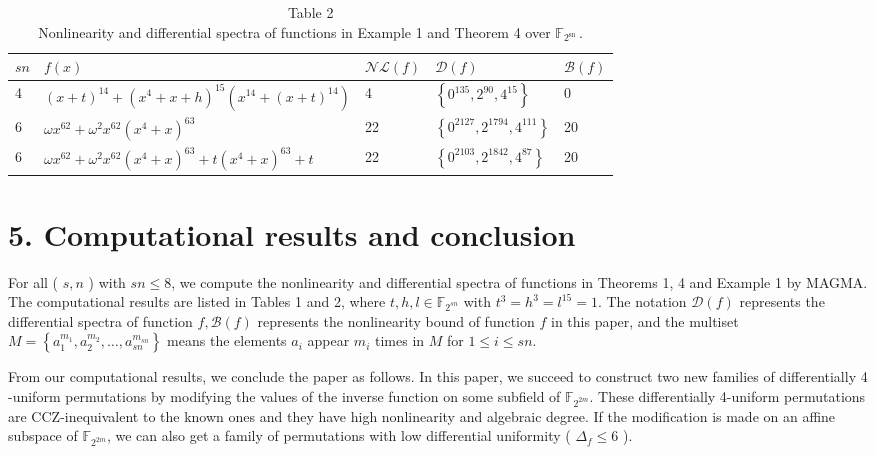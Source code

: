 \documentclass[10pt]{article}
\begin{document}
\begin{table}[h]
\begin{center}
\captionsetup{labelformat=empty}
\caption{Table 2\\
Nonlinearity and differential spectra of functions in Example 1 and Theorem 4 over $\mathbb{F}_{2^{\text {sn }}}$.}
\begin{tabular}{|l|l|l|l|l|}
\hline
$s n$ & $f(x)$ & $\mathcal{N} \mathcal{L}(f)$ & $\mathcal{D}(f)$ & $\mathcal{B}(f)$ \\
\hline
4 & $(x+t)^{14}+\left(x^{4}+x+h\right)^{15}\left(x^{14}+(x+t)^{14}\right)$ & 4 & $\left\{0^{135}, 2^{90}, 4^{15}\right\}$ & 0 \\
\hline
6 & $\omega x^{62}+\omega^{2} x^{62}\left(x^{4}+x\right)^{63}$ & 22 & $\left\{0^{2127}, 2^{1794}, 4^{111}\right\}$ & 20 \\
\hline
6 & $\omega x^{62}+\omega^{2} x^{62}\left(x^{4}+x\right)^{63}+t\left(x^{4}+x\right)^{63}+t$ & 22 & $\left\{0^{2103}, 2^{1842}, 4^{87}\right\}$ & 20 \\
\hline
\end{tabular}
\end{center}
\end{table}

\section*{5. Computational results and conclusion}
For all ( $s, n$ ) with $s n \leqslant 8$, we compute the nonlinearity and differential spectra of functions in Theorems 1, 4 and Example 1 by MAGMA. The computational results are listed in Tables 1 and 2, where $t, h, l \in \mathbb{F}_{2^{s n}}$ with $t^{3}=h^{3}=l^{15}=1$. The notation $\mathcal{D}(f)$ represents the differential spectra of function $f, \mathcal{B}(f)$ represents the nonlinearity bound of function $f$ in this paper, and the multiset $M=\left\{a_{1}^{m_{1}}, a_{2}^{m_{2}}, \ldots, a_{s n}^{m_{s n}}\right\}$ means the elements $a_{i}$ appear $m_{i}$ times in $M$ for $1 \leqslant i \leqslant s n$.

From our computational results, we conclude the paper as follows. In this paper, we succeed to construct two new families of differentially 4 -uniform permutations by modifying the values of the inverse function on some subfield of $\mathbb{F}_{2^{2 m}}$. These differentially 4-uniform permutations are CCZ-inequivalent to the known ones and they have high nonlinearity and algebraic degree. If the modification is made on an affine subspace of $\mathbb{F}_{2^{2 m}}$, we can also get a family of permutations with low differential uniformity ( $\Delta_{f} \leqslant 6$ ).
\end{document}
